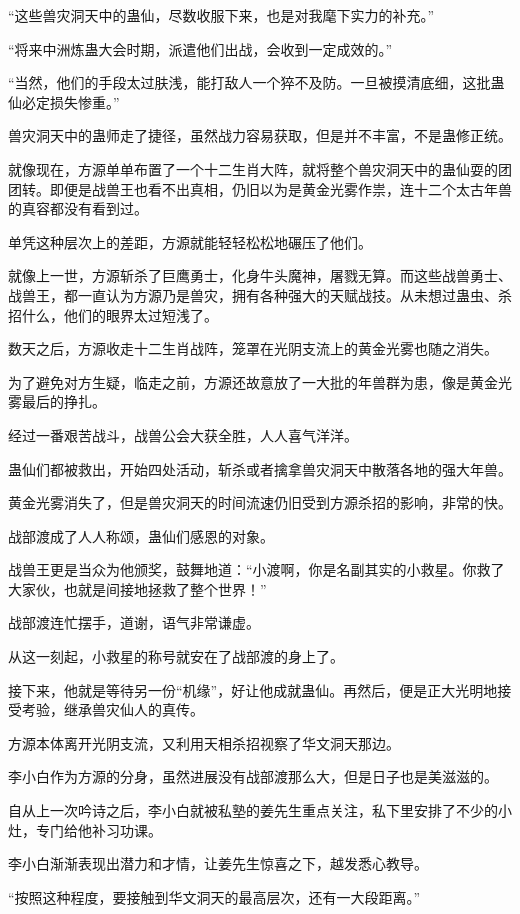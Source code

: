 \begin{this_body}
“这些兽灾洞天中的蛊仙，尽数收服下来，也是对我麾下实力的补充。”

“将来中洲炼蛊大会时期，派遣他们出战，会收到一定成效的。”

“当然，他们的手段太过肤浅，能打敌人一个猝不及防。一旦被摸清底细，这批蛊仙必定损失惨重。”

兽灾洞天中的蛊师走了捷径，虽然战力容易获取，但是并不丰富，不是蛊修正统。

就像现在，方源单单布置了一个十二生肖大阵，就将整个兽灾洞天中的蛊仙耍的团团转。即便是战兽王也看不出真相，仍旧以为是黄金光雾作祟，连十二个太古年兽的真容都没有看到过。

单凭这种层次上的差距，方源就能轻轻松松地碾压了他们。

就像上一世，方源斩杀了巨鹰勇士，化身牛头魔神，屠戮无算。而这些战兽勇士、战兽王，都一直认为方源乃是兽灾，拥有各种强大的天赋战技。从未想过蛊虫、杀招什么，他们的眼界太过短浅了。

数天之后，方源收走十二生肖战阵，笼罩在光阴支流上的黄金光雾也随之消失。

为了避免对方生疑，临走之前，方源还故意放了一大批的年兽群为患，像是黄金光雾最后的挣扎。

经过一番艰苦战斗，战兽公会大获全胜，人人喜气洋洋。

蛊仙们都被救出，开始四处活动，斩杀或者擒拿兽灾洞天中散落各地的强大年兽。

黄金光雾消失了，但是兽灾洞天的时间流速仍旧受到方源杀招的影响，非常的快。

战部渡成了人人称颂，蛊仙们感恩的对象。

战兽王更是当众为他颁奖，鼓舞地道：“小渡啊，你是名副其实的小救星。你救了大家伙，也就是间接地拯救了整个世界！”

战部渡连忙摆手，道谢，语气非常谦虚。

从这一刻起，小救星的称号就安在了战部渡的身上了。

接下来，他就是等待另一份“机缘”，好让他成就蛊仙。再然后，便是正大光明地接受考验，继承兽灾仙人的真传。

方源本体离开光阴支流，又利用天相杀招视察了华文洞天那边。

李小白作为方源的分身，虽然进展没有战部渡那么大，但是日子也是美滋滋的。

自从上一次吟诗之后，李小白就被私塾的姜先生重点关注，私下里安排了不少的小灶，专门给他补习功课。

李小白渐渐表现出潜力和才情，让姜先生惊喜之下，越发悉心教导。

“按照这种程度，要接触到华文洞天的最高层次，还有一大段距离。”


\end{this_body}
